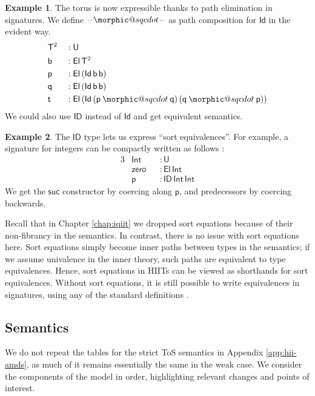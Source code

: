 \documentclass[12pt,a4paper,twoside,openany]{book}
\makeatletter
\DeclareRobustCommand{\sqcdot}{\mathbin{\mathpalette\morphic@sqcdot\relax}}
\newcommand{\morphic@sqcdot}[2]{%
  \sbox\z@{$\m@th#1\centerdot$}%
  \ht\z@=.33333\ht\z@
  \vcenter{\box\z@}%
}
\theoremstyle{remark}
\theoremstyle{definition}
\newtheorem{myexample}{Example}
\theoremstyle{theorem}
\newcommand{\ms}[1]{\mathsf{#1}}
\newcommand{\zero}{\ms{zero}}
\newcommand{\suc}{\ms{suc}}
\newcommand{\U}{\mathsf{U}}
\newcommand{\El}{\mathsf{El}}
\newcommand{\Id}{\mathsf{Id}}
\newcommand{\ID}{\mathsf{ID}}
\newcommand{\blank}{\mathord{\hspace{1pt}\text{--}\hspace{1pt}}}
\newcommand{\p}{\mathsf{p}}
\newcommand{\q}{\mathsf{q}}
\makeatother
\begin{document}
\begin{myexample}
The torus is now expressible thanks to path elimination in signatures. We define
$\blank\!\sqcdot\!\blank$ as path composition for $\Id$ in the evident way.
\begin{alignat*}{3}
  &\ms{T}^2  &&: \U\\
  &\ms{b}    &&: \El\,\ms{T}^2\\
  &\ms{p}    &&: \El\,(\Id\,\ms{b}\,\ms{b})\\
  &\ms{q}    &&: \El\,(\Id\,\ms{b}\,\ms{b})\\
  &\ms{t}    &&: \El\,(\Id\,(\p \sqcdot \q)\,(\q \sqcdot \p))
\end{alignat*}
We could also use $\ID$ instead of $\Id$ and get equivalent semantics.
\end{myexample}

\begin{myexample}
The $\ID$ type lets us express ``sort equivalences''. For example, a signature
for integers can be compactly written as follows \cite{hit-integers}:
\begin{alignat*}{3}
  &\ms{Int}  &&: \U\\
  &\zero     &&: \El\,\ms{Int}\\
  &\p        &&: \ID\,\ms{Int}\,\ms{Int}
\end{alignat*}
We get the $\suc$ constructor by coercing along $\p$, and predecessors by
coercing backwards.


Recall that in Chapter \ref{chap:iqiit} we dropped sort equations because of
their non-fibrancy in the semantics. In contrast, there is no issue with sort
equations here. Sort equations simply become inner paths between types in the
semantics; if we assume univalence in the inner theory, such paths are
equivalent to type equivalences. Hence, sort equations in HIITs can be viewed as
shorthands for sort equivalences. Without sort equations, it is still possible
to write equivalences in signatures, using any of the standard definitions
\cite[Chapter~4]{hottbook}.
\end{myexample}

\subsection{Semantics}

We do not repeat the tables for the strict ToS semantics in Appendix
\ref{app:hii-amds}, as much of it remains essentially the same in the weak
case. We consider the components of the model in order, highlighting relevant
changes and points of interest.
\end{document}
